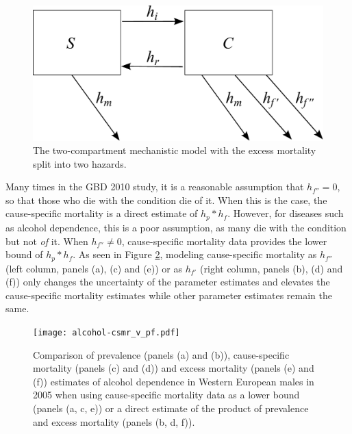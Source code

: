     \begin{figure}[h]
        \begin{center}
            \includegraphics[width=\textwidth]{SC2.pdf}
            \caption{The two-compartment mechanistic model with the excess mortality split into two hazards.}
            \label{fig:two_compartment_2f}
        \end{center}
    \end{figure}

Many times in the GBD 2010 study, it is a reasonable assumption that $h_{f''} = 0$, so that those who die with the condition die of it.  When this is the case, the cause-specific mortality is a direct estimate of $h_{p}*h_{f}$.  However, for diseases such as alcohol dependence, this is a poor assumption, as many die with the condition but not \emph{of} it.  When $h_{f''} \neq 0$, cause-specific mortality data provides the lower bound of $h_{p}*h_{f}$.  As seen in Figure \ref{fig:app-alcohol compare}, modeling cause-specific mortality as $h_{f''}$ (left column, panels (a), (c) and (e)) or as $h_{f'}$ (right column, panels (b), (d) and (f)) only changes the uncertainty of the parameter estimates and elevates the cause-specific mortality estimates while other parameter estimates remain the same.

    \begin{figure}[h]
        \begin{center}
            \texttt{[image: alcohol-csmr\_v\_pf.pdf]}
            \caption{Comparison of prevalence (panels (a) and (b)), cause-specific mortality (panels (c) and (d)) and excess mortality (panels (e) and (f)) estimates of alcohol dependence in Western European males in 2005 when using cause-specific mortality data as a lower bound (panels (a, c, e)) or a direct estimate of the product of prevalence and excess mortality (panels (b, d, f)).}
            \label{fig:app-alcohol compare}
        \end{center}
    \end{figure} 